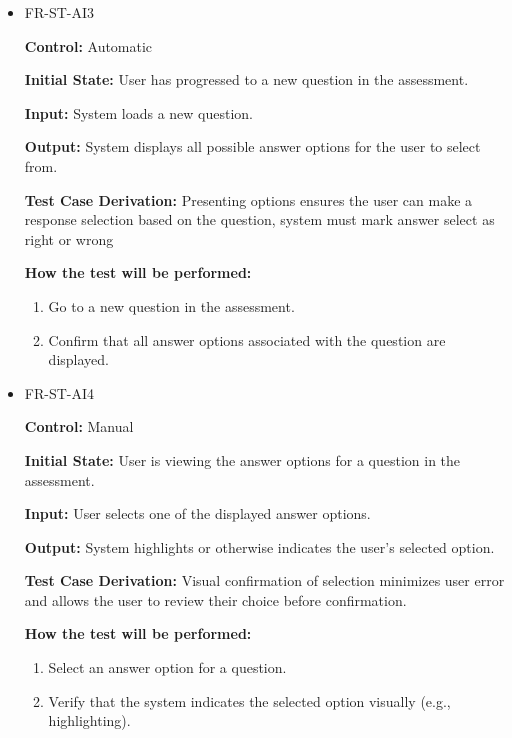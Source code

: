 \documentclass[12pt, titlepage]{article}
\begin{document}
\begin{itemize}
  \item FR-ST-AI3
    \begin{mdframed}[linewidth=0.5mm]
      \textbf{Control:} Automatic \par
      \textbf{Initial State:} User has progressed to a new question in the assessment. \par
      \textbf{Input:} System loads a new question. \par
      \textbf{Output:} System displays all possible answer options for the user to select from. \par
      \textbf{Test Case Derivation:} Presenting options ensures the user can make a response selection based on the question, system must mark answer select as right or wrong \par
      \textbf{How the test will be performed:}
      \begin{enumerate}[noitemsep]
        \item Go to a new question in the assessment.
        \item Confirm that all answer options associated with the question are displayed.
      \end{enumerate}
    \end{mdframed}

  \item FR-ST-AI4
    \begin{mdframed}[linewidth=0.5mm]
      \textbf{Control:} Manual \par
      \textbf{Initial State:} User is viewing the answer options for a question in the assessment. \par
      \textbf{Input:} User selects one of the displayed answer options. \par
      \textbf{Output:} System highlights or otherwise indicates the user’s selected option. \par
      \textbf{Test Case Derivation:} Visual confirmation of selection minimizes user error and allows the user to review their choice before confirmation. \par
      \textbf{How the test will be performed:}
      \begin{enumerate}[noitemsep]
        \item Select an answer option for a question.
        \item Verify that the system indicates the selected option visually (e.g., highlighting).
      \end{enumerate}
    \end{mdframed}


\end{itemize}
\end{document}
